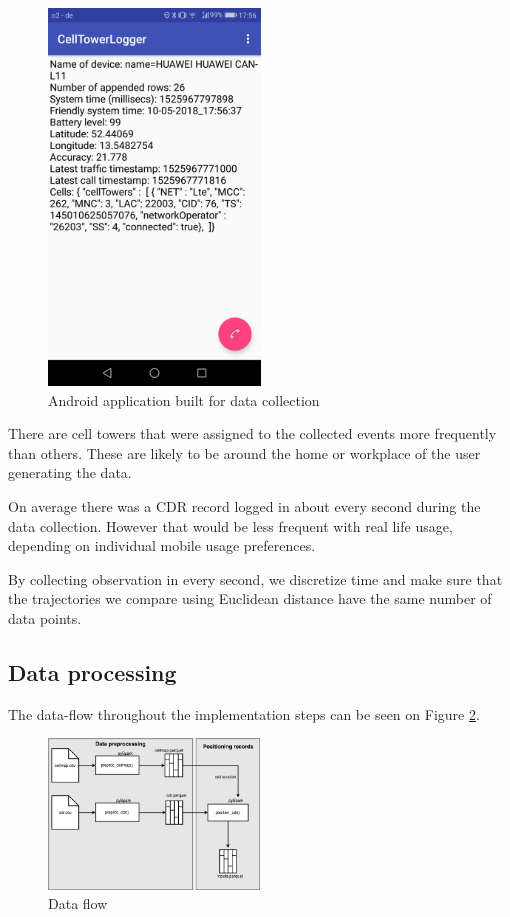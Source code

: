 \begin{figure}[h]
    \begin{center}
    \includegraphics[height=10cm]{images/celltower_logger.png}
    \caption{Android application built for data collection}
    \label{fig:app}
    \end{center}
\end{figure}

There are cell towers that were assigned to the collected events more frequently than others. These are likely to be around the home or workplace of the user generating the data.

On average there was a CDR record logged in about every second during the data collection. However that would be less frequent with real life usage, depending on individual mobile usage preferences. 

By collecting observation in every second, we discretize time and make sure that the trajectories we compare using Euclidean distance have the same number of data points.

\subsection{Data processing}\label{sec:data-proc}
The data-flow throughout the implementation steps can be seen on Figure \ref{fig:data-flow}.
\begin{figure}[h]
    \centering
    \includegraphics[width=0.5\textwidth]{images/data-flow.png}
    \caption{Data flow}
    \label{fig:data-flow}
\end{figure}

